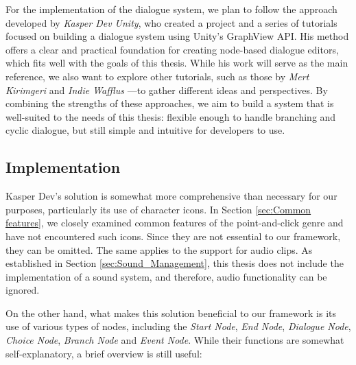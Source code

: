 For the implementation of the dialogue system, we plan to follow the approach developed by \textit{Kasper Dev Unity}, who created a project \cite{Kasper-Dialogue-Tutorial-git} and a series of tutorials \cite{Kasper-Dialogue-Tutorial-YT} focused on building a dialogue system using Unity’s GraphView API. His method offers a clear and practical foundation for creating node-based dialogue editors, which fits well with the goals of this thesis. While his work will serve as the main reference, we also want to explore other tutorials, such as those by \textit{Mert Kirimgeri} \cite{merpheus-Dialogue-Tutorial-git}\cite{merpheus-Dialogue-Tutorial-YT} and \textit{Indie Wafflus} \cite{Wafflus-Dialogue-Tutorial-git}\cite{Wafflus-Dialogue-Tutorial-YT}—to gather different ideas and perspectives. By combining the strengths of these approaches, we aim to build a system that is well-suited to the needs of this thesis: flexible enough to handle branching and cyclic dialogue, but still simple and intuitive for developers to use. 

\subsection{Implementation}
Kasper Dev's solution is somewhat more comprehensive than necessary for our purposes, particularly its use of character icons. In Section \ref{sec:Common features}, we closely examined common features of the point-and-click genre and have not encountered such icons. Since they are not essential to our framework, they can be omitted. The same applies to the support for audio clips. As established in Section \ref{sec:Sound_Management}, this thesis does not include the implementation of a sound system, and therefore, audio functionality can be ignored.

On the other hand, what makes this solution beneficial to our framework is its use of various types of nodes, including the \textit{Start Node}, \textit{End Node}, \textit{Dialogue Node}, \textit{Choice Node}, \textit{Branch Node} and \textit{Event Node}. While their functions are somewhat self-explanatory, a brief overview is still useful:

